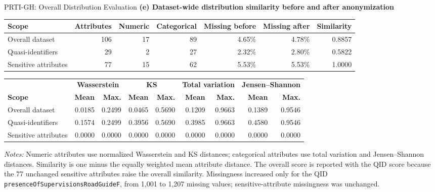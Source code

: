 \documentclass[9pt]{beamer}
\begin{document}
\begin{frame}[t]{PRTI-GH: Overall Distribution Evaluation}
    \scriptsize
    \centering
    \textbf{(e) Dataset-wide distribution similarity before and after anonymization}

    \vspace{0.22cm}
    \renewcommand{\arraystretch}{1.18}
    \setlength{\tabcolsep}{4pt}

    \begin{tabular*}{\textwidth}{@{}@{\extracolsep{\fill}}lrrrrrr@{}}
        \toprule
        \textbf{Scope} & \textbf{Attributes} & \textbf{Numeric} &
        \textbf{Categorical} & \textbf{Missing before} &
        \textbf{Missing after} & \textbf{Similarity} \\
        \midrule
        Overall dataset      & 106 & 17 & 89 & 4.65\% & 4.78\% & 0.8857 \\
        Quasi-identifiers    &  29 &  2 & 27 & 2.32\% & 2.80\% & 0.5822 \\
        Sensitive attributes & 77 & 15 & 62 & 5.53\% & 5.53\% & 1.0000 \\
        \bottomrule
    \end{tabular*}

    \vspace{0.35cm}
    \begin{tabular*}{\textwidth}{@{}@{\extracolsep{\fill}}lrrrrrrrr@{}}
        \toprule
        & \multicolumn{2}{c}{\textbf{Wasserstein}} &
        \multicolumn{2}{c}{\textbf{KS}} &
        \multicolumn{2}{c}{\textbf{Total variation}} &
        \multicolumn{2}{c}{\textbf{Jensen--Shannon}} \\
        \cmidrule(lr){2-3}\cmidrule(lr){4-5}\cmidrule(lr){6-7}\cmidrule(lr){8-9}
        \textbf{Scope} & \textbf{Mean} & \textbf{Max.} &
        \textbf{Mean} & \textbf{Max.} & \textbf{Mean} & \textbf{Max.} &
        \textbf{Mean} & \textbf{Max.} \\
        \midrule
        Overall dataset       & 0.0185 & 0.2499 & 0.0465 & 0.5690 & 0.1209 & 0.9663 & 0.1389 & 0.9546 \\
        Quasi-identifiers     & 0.1574 & 0.2499 & 0.3956 & 0.5690 & 0.3985 & 0.9663 & 0.4580 & 0.9546 \\
        Sensitive attributes & 0.0000 & 0.0000 & 0.0000 & 0.0000 & 0.0000 & 0.0000 & 0.0000 & 0.0000 \\
        \bottomrule
    \end{tabular*}

    \vspace{0.28cm}
    \begin{minipage}{0.97\textwidth}
        \tiny
        \textit{Notes:} Numeric attributes use normalized Wasserstein and KS
        distances; categorical attributes use total variation and
        Jensen--Shannon distances. Similarity is one minus the equally weighted
        mean attribute distance. The overall score is reported with the QID
        score because the 77 unchanged sensitive attributes raise the overall
        similarity. Missingness increased only for the QID
        \texttt{presenceOfSupervisionsRoadGuideF}, from 1,001 to 1,207 missing
        values; sensitive-attribute missingness was unchanged.
    \end{minipage}
\end{frame}
\end{document}
